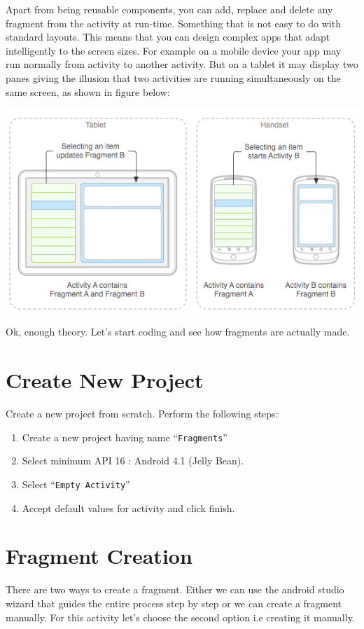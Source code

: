 Apart from being reusable components, you can add, replace and delete any fragment from the activity at run-time. Something that is not easy to do with standard layouts. This means that you can design complex apps that adapt intelligently to the screen sizes. For example on a mobile device your app may run normally from activity to another activity. But on a tablet it may display two panes giving the illusion that two activities are running simultaneously on the same screen, as shown in figure below:

\begin{center}
	\includegraphics[scale=\FigureScale]{chapters/ch11/images/1}
\end{center}

Ok, enough theory. Let's start coding and see how fragments are actually made.

\section{Create New Project}
\label{FRAG:createProj}

Create a new project from scratch. Perform the following steps:
\begin{enumerate}
	\item Create a new project having name ``\texttt{Fragments}''
	\item Select minimum API 16 : Android 4.1 (Jelly Bean).
	\item Select ``\texttt{Empty Activity}''
	\item Accept default values for activity and click finish. \\
\end{enumerate}

\section{Fragment Creation}
\label{FRAG:fragmentCreation}
There are two ways to create a fragment. Either we can use the android studio wizard that guides the entire process step by step or we can create a fragment manually. For this activity let's choose the second option i.e creating it manually. \\

